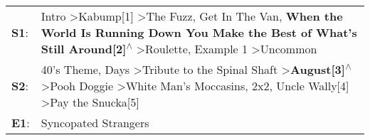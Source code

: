 \begin{supertabular}{p{0.03\textwidth}p{0.92\textwidth}}
 \textbf{S1}:  &                           Intro\textsuperscript{} \textgreater \enspace Kabump[1]\textsuperscript{} \textgreater \enspace The Fuzz\textsuperscript{}, \enspace Get In The Van\textsuperscript{}, \enspace \textbf{When the World Is Running Down You Make the Best of What's Still Around[2]\textsuperscript{$\wedge$}} \textgreater \enspace Roulette\textsuperscript{}, \enspace Example 1\textsuperscript{} \textgreater \enspace Uncommon\textsuperscript{}  \enspace  \\
 \textbf{S2}:  &  40's Theme\textsuperscript{},  Days\textsuperscript{} \textgreater \enspace Tribute to the Spinal Shaft\textsuperscript{} \textgreater \enspace \textbf{August[3]\textsuperscript{$\wedge$}} \textgreater \enspace Pooh Doggie\textsuperscript{} \textgreater \enspace White Man's Moccasins\textsuperscript{}, \enspace 2x2\textsuperscript{}, \enspace Uncle Wally[4]\textsuperscript{} \textgreater \enspace Pay the Snucka[5]\textsuperscript{}  \enspace  \\
 \textbf{E1}:  &                                                                                                                                                                                                                                                                                                                                                                                                                          Syncopated Strangers\textsuperscript{}  \enspace  \\
\end{supertabular}
